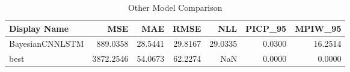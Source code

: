 \begin{table}
\caption{Other Model Comparison}
\begin{tabular}{lrrrrrr}
\toprule
Display Name & MSE & MAE & RMSE & NLL & PICP_95 & MPIW_95 \\
\midrule
BayesianCNNLSTM & 889.0358 & 28.5441 & 29.8167 & 29.0335 & 0.0300 & 16.2514 \\
best & 3872.2546 & 54.0673 & 62.2274 & NaN & 0.0000 & 0.0000 \\
\bottomrule
\end{tabular}
\end{table}
